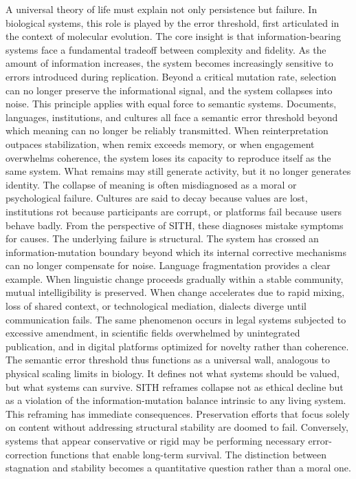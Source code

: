\documentclass[11pt,oneside]{article}
\begin{document}
A universal theory of life must explain not only persistence but failure. In biological systems, this role is played by the error threshold, first articulated in the context of molecular evolution. The core insight is that information-bearing systems face a fundamental tradeoff between complexity and fidelity. As the amount of information increases, the system becomes increasingly sensitive to errors introduced during replication. Beyond a critical mutation rate, selection can no longer preserve the informational signal, and the system collapses into noise.
This principle applies with equal force to semantic systems. Documents, languages, institutions, and cultures all face a semantic error threshold beyond which meaning can no longer be reliably transmitted. When reinterpretation outpaces stabilization, when remix exceeds memory, or when engagement overwhelms coherence, the system loses its capacity to reproduce itself as the same system. What remains may still generate activity, but it no longer generates identity.
The collapse of meaning is often misdiagnosed as a moral or psychological failure. Cultures are said to decay because values are lost, institutions rot because participants are corrupt, or platforms fail because users behave badly. From the perspective of SITH, these diagnoses mistake symptoms for causes. The underlying failure is structural. The system has crossed an information-mutation boundary beyond which its internal corrective mechanisms can no longer compensate for noise.
Language fragmentation provides a clear example. When linguistic change proceeds gradually within a stable community, mutual intelligibility is preserved. When change accelerates due to rapid mixing, loss of shared context, or technological mediation, dialects diverge until communication fails. The same phenomenon occurs in legal systems subjected to excessive amendment, in scientific fields overwhelmed by unintegrated publication, and in digital platforms optimized for novelty rather than coherence.
The semantic error threshold thus functions as a universal wall, analogous to physical scaling limits in biology. It defines not what systems should be valued, but what systems can survive. SITH reframes collapse not as ethical decline but as a violation of the information-mutation balance intrinsic to any living system.
This reframing has immediate consequences. Preservation efforts that focus solely on content without addressing structural stability are doomed to fail. Conversely, systems that appear conservative or rigid may be performing necessary error-correction functions that enable long-term survival. The distinction between stagnation and stability becomes a quantitative question rather than a moral one.
\end{document}
